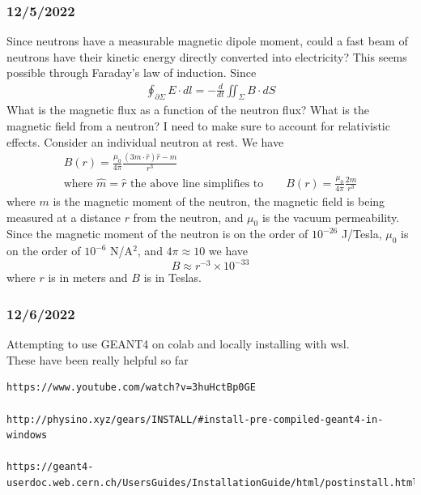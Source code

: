 \documentclass[12pt]{article}
\begin{document}
\subsubsection{12/5/2022}
Since neutrons have a measurable magnetic dipole moment, could a fast beam of neutrons have their kinetic energy directly converted into electricity? This seems possible through Faraday's law of induction. Since 
\begin{equation}\label{eqn:intFaradayLaw}
\begin{split}
\oint_{\partial\Sigma} E \cdot dl = -\frac{d}{dt}\iint_{\Sigma} B \cdot dS
\end{split}
\end{equation}
What is the magnetic flux as a function of the neutron flux? What is the magnetic field from a neutron? I need to make sure to account for relativistic effects. Consider an individual neutron at rest. We have 
\begin{equation}\label{eqn:dipoleB}
\begin{split}
B(r) = \frac{\mu_0}{4\pi}\frac{(3m\cdot\hat{r})\hat{r}-m}{r^3}\\
\text{where $\hat{m}=\hat{r}$ the above line simplifies to} \quad\quad B(r) = \frac{\mu_0}{4\pi}\frac{2m}{r^3}
\end{split}
\end{equation}
where $m$ is the magnetic moment of the neutron, the magnetic field is being measured at a distance $r$ from the neutron, and $\mu_0$ is the vacuum permeability. Since the magnetic moment of the neutron is on the order of $10^{-26}$ J/Tesla, $\mu_0$ is on the order of $10^{-6}$ N/A$^2$, and $4\pi\approx10$ we have 
\begin{equation}
    B\approx r^{-3}\times10^{-33}
\end{equation}
where $r$ is in meters and $B$ is in Teslas. 
\subsubsection{12/6/2022}
Attempting to use GEANT4 on colab and locally installing with wsl. \\
These have been really helpful so far
\begin{lstlisting}[breaklines]
https://www.youtube.com/watch?v=3huHctBp0GE

http://physino.xyz/gears/INSTALL/#install-pre-compiled-geant4-in-windows

https://geant4-userdoc.web.cern.ch/UsersGuides/InstallationGuide/html/postinstall.html#datasets
\end{lstlisting}
\end{document}
